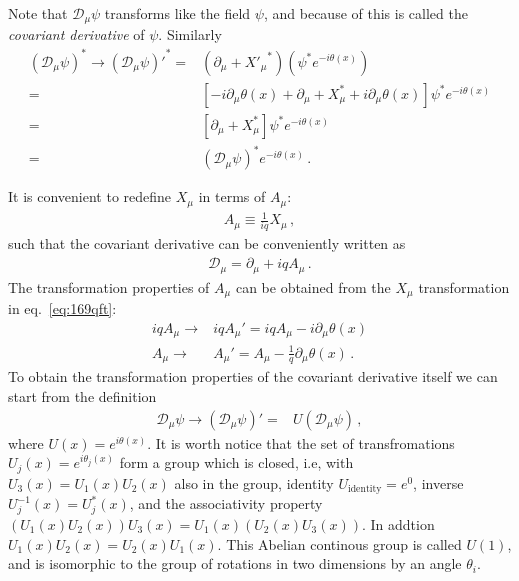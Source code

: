 Note that $\mathcal{D}_\mu\psi$ transforms like the field $\psi$, and because of this is called the \emph{covariant derivative} of $\psi$.
Similarly
\begin{align}
    (\mathcal{D}_\mu \psi)^*\to{\left(\mathcal{D}_\mu \psi\right)'}^*=&(\partial_\mu+{X'_\mu}^*) \left(\psi^*e^{-i\theta(x)}\right)\nonumber\\
=&\left[-i\partial_\mu \theta(x)+\partial_\mu+X_\mu^*+i\partial_\mu\theta(x) \right]\psi^*e^{-i\theta(x)}\nonumber\\
=&\left[\partial_\mu+X_\mu^*\right]\psi^*e^{-i\theta(x)}\nonumber\\
=&\left(\mathcal{D}_\mu\psi\right)^*e^{-i\theta(x)}\,.
\end{align}

It is convenient to redefine $X_\mu$ in terms of $A_\mu$:
\begin{align}
  A_\mu\equiv\frac{1}{i q}X_\mu\,,
\end{align}
such that the covariant derivative can be conveniently written as
\begin{align}
\label{eq:170qft}
  \mathcal{D}_\mu=\partial_\mu+i q A_\mu\,.
\end{align}
The transformation properties of $A_\mu$ can be obtained from the $X_\mu$ transformation in eq.~\eqref{eq:169qft}: 
\begin{align}
\label{eq:159qft}
 i q A_\mu\to& i q A_\mu'=i q A_\mu-i \partial_\mu\theta(x)\nonumber\\
  A_\mu\to&  A_\mu'= A_\mu-\frac{1}{q} \partial_\mu\theta(x)\,.
\end{align}
To obtain the transformation properties of the covariant derivative itself we can start from the definition
\begin{align}
    \mathcal{D}_\mu \psi\to\left(\mathcal{D}_\mu \psi\right)'=&U\left(\mathcal{D}_\mu \psi\right)\,,
\end{align}
where $U(x)=e^{i\theta(x)}$. It is worth notice that the set of
transfromations $U_j(x)=e^{i\theta_j(x)}$ form a group which is
closed, i.e, with $U_3(x)=U_1(x)U_2(x)$ also in the group, identity
$U_{\text{identity}}=e^{0}$, inverse $U_{j}^{-1}(x)=U_{j}^{*}(x)$, and the associativity property $\left( U_1(x)U_2(x) \right)U_3(x)=U_1(x)\left( U_2(x)U_3(x) \right)$. In addtion $U_1(x)U_2(x)=U_2(x)U_1(x)$. This Abelian continous group is called $U(1)$, and is isomorphic to the group of rotations in two dimensions by an angle $\theta_i$. 

